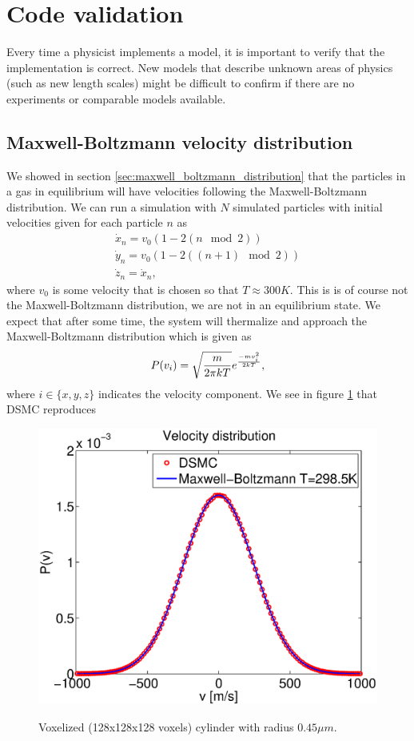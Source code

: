\section{Code validation}
Every time a physicist implements a model, it is important to verify that the implementation is correct. New models that describe unknown areas of physics (such as new length scales) might be difficult to confirm if there are no experiments or comparable models available. 
\subsection{Maxwell-Boltzmann velocity distribution}
We showed in section \ref{sec:maxwell_boltzmann_distribution} that the particles in a gas in equilibrium will have velocities following the Maxwell-Boltzmann distribution. We can run a simulation with $N$ simulated particles with initial velocities given for each particle $n$ as
\begin{align}
	\dot x_n = v_0(1 - 2 (n\mod 2))\\
	\dot y_n = v_0(1 - 2 ((n+1)\mod 2))\\
	\dot z_n = \dot x_n,
\end{align}
where $v_0$ is some velocity that is chosen so that $T\approx 300K$. This is is of course not the Maxwell-Boltzmann distribution, we are not in an equilibrium state. We expect that after some time, the system will thermalize and approach the Maxwell-Boltzmann distribution which is given as
\begin{align}
	P(v_i) = \sqrt{m\over 2\pi kT}e^{-mv_i^2\over 2kT},
\end{align}
where $i\in \{x,y,z\}$ indicates the velocity component. We see in figure \ref{fig:velocity_distribution} that DSMC reproduces
\begin{figure}[h]
\begin{center}
\includegraphics[width=\textwidth, trim=0cm 0cm 0cm 0cm, clip]{DSMC/figures/velocity_distribution.eps}
\label{fig:velocity_distribution}
\end{center}
\caption{Voxelized (128x128x128 voxels) cylinder with radius $0.45\mu m$.}
\end{figure}

